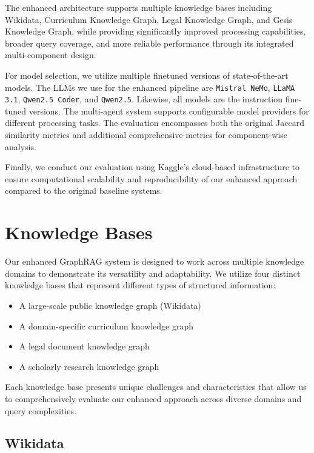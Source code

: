 The enhanced architecture supports multiple knowledge bases including Wikidata, Curriculum Knowledge Graph, Legal Knowledge Graph, and Gesis Knowledge Graph, while providing significantly improved processing capabilities, broader query coverage, and more reliable performance through its integrated multi-component design.

For model selection, we utilize multiple finetuned versions of state-of-the-art models. The LLMs we use for the enhanced pipeline are \texttt{Mistral NeMo}, \texttt{LLaMA 3.1}, \texttt{Qwen2.5 Coder}, and \texttt{Qwen2.5}. Likewise, all models are the instruction fine-tuned versions. The multi-agent system supports configurable model providers for different processing tasks. The evaluation encompasses both the original Jaccard similarity metrics and additional comprehensive metrics for component-wise analysis.

Finally, we conduct our evaluation using Kaggle's cloud-based infrastructure to ensure computational scalability and reproducibility of our enhanced approach compared to the original baseline systems.


\section{Knowledge Bases} \label{knowledgebase}
Our enhanced GraphRAG system is designed to work across multiple knowledge domains to demonstrate its versatility and adaptability. We utilize four distinct knowledge bases that represent different types of structured information:

\begin{itemize}
    \item A large-scale public knowledge graph (Wikidata)
    \item A domain-specific curriculum knowledge graph
    \item A legal document knowledge graph
    \item A scholarly research knowledge graph
\end{itemize}

Each knowledge base presents unique challenges and characteristics that allow us to comprehensively evaluate our enhanced approach across diverse domains and query complexities.

\subsection{Wikidata}

